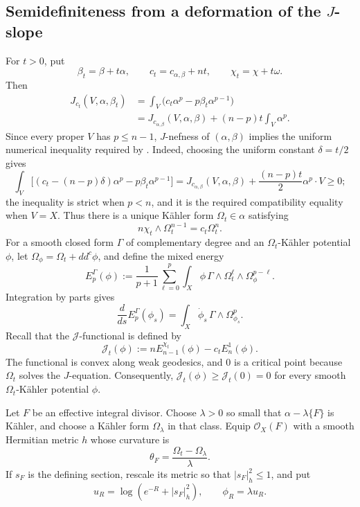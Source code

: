 \documentclass[reqno]{amsart}
\newcommand{\ddc}{dd^c}
\newcommand{\cab}{c_{\alpha,\beta}}
\theoremstyle{plain}
\theoremstyle{remark}
\begin{document}
\subsection{Semidefiniteness from a deformation of the
\texorpdfstring{$J$}{J}-slope}
For $t>0$, put
\[
\beta_t=\beta+t\alpha,\qquad c_t=\cab+nt,\qquad \chi_t=\chi+t\omega.
\]
Then
\[
\begin{aligned}
J_{c_t}(V,\alpha,\beta_t)
&=\int_V\bigl(c_t\alpha^p-p\beta_t\alpha^{p-1}\bigr)\\
&=J_{\cab}(V,\alpha,\beta)+(n-p)t\int_V\alpha^p.
\end{aligned}
\]
Since every proper $V$ has $p\leq n-1$, $J$-nefness of
$(\alpha,\beta)$ implies the uniform numerical inequality required by
\cite[Theorem~1.1]{C21}. Indeed, choosing the uniform constant
$\delta=t/2$ gives
\[
 \int_V\bigl[(c_t-(n-p)\delta)\alpha^p
       -p\beta_t\alpha^{p-1}\bigr]
 =J_{\cab}(V,\alpha,\beta)
  +\frac{(n-p)t}{2}\alpha^p\cdot V\geq0;
\]
the inequality is strict when $p<n$, and it is the required
compatibility equality when $V=X$. Thus there is a
unique K\"ahler form $\Omega_t\in\alpha$ satisfying
\[
 n\chi_t\wedge\Omega_t^{n-1}=c_t\Omega_t^n.
\]
For a smooth closed form $\Gamma$ of complementary degree and an
$\Omega_t$-K\"ahler potential $\phi$, let
$\Omega_\phi=\Omega_t+\ddc\phi$, and define the mixed energy
\begin{equation}\label{eq:mixed-energy}
 E_p^\Gamma(\phi)
 :=
 \frac1{p+1}\sum_{\ell=0}^p
 \int_X\phi\,\Gamma\wedge
 \Omega_t^\ell\wedge\Omega_\phi^{p-\ell}.
\end{equation}
Integration by parts gives
\[
 \frac d{ds}E_p^\Gamma(\phi_s)
 =\int_X\dot\phi_s\,\Gamma\wedge\Omega_{\phi_s}^p.
\]
Recall that the $\mathcal J$-functional is defined by
\begin{equation}\label{eq:J-functional}
 \mathcal J_t(\phi)
 :=nE_{n-1}^{\chi_t}(\phi)-c_tE_n^1(\phi).
\end{equation}
The functional is convex along weak geodesics, and $0$ is a critical
point because $\Omega_t$ solves the $J$-equation. Consequently,
$\mathcal J_t(\phi)\geq\mathcal J_t(0)=0$ for every smooth $\Omega_t$-K\"ahler
potential $\phi$.

Let $F$ be an effective integral divisor.  Choose $\lambda>0$ so
small that $\alpha-\lambda\{F\}$ is K\"ahler, and choose a K\"ahler form
$\Omega_{\lambda}$ in that class.  Equip
$\mathcal O_X(F)$ with a smooth Hermitian metric $h$ whose curvature is
\[
 \theta_F=\frac{\Omega_t-\Omega_{\lambda}}{\lambda}.
\]
If $s_F$ is the defining section, rescale its metric so that
$|s_F|_h^2\leq1$, and put
\begin{equation}\label{eq:log-test}
 u_R=\log(e^{-R}+|s_F|_h^2),\qquad \phi_R=\lambda u_R.
\end{equation}
\end{document}
